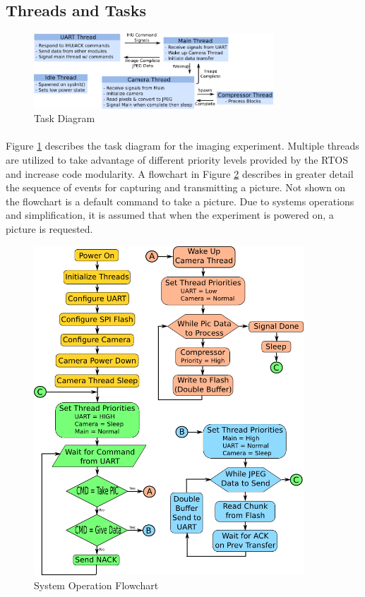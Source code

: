 \documentclass[10pt]{article}
\begin{document}
\subsection*{Threads and Tasks}
\begin{figure}
	\centering
	\includegraphics[width=0.8\textwidth]{task_diagram.png}
	\caption{Task Diagram}
	\label{task_diagram}
\end{figure}
\paragraph*{}Figure \ref{task_diagram} describes the task diagram for the imaging experiment.  Multiple threads are utilized to take advantage of different priority levels provided by the RTOS and increase code modularity.  A flowchart in Figure \ref{flowchart} describes in greater detail the sequence of events for capturing and transmitting a picture.  Not shown on the flowchart is a default command to take a picture.  Due to systems operations and simplification, it is assumed that when the experiment is powered on, a picture is requested.

\begin{figure}
	\centering
	\includegraphics[width=0.9\textwidth]{flow_chart.png}
	\caption{System Operation Flowchart}
	\label{flowchart}
\end{figure}
\end{document}
